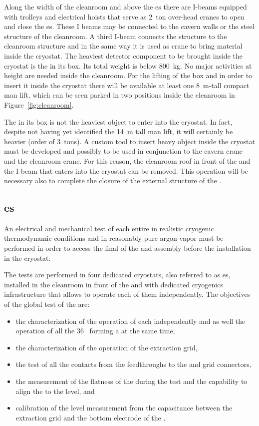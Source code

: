 Along the width of the cleanroom and above the \coldbox{}es there are I-beams equipped with trolleys and electrical hoists that serve as 2~ton over-head cranes to open and close the  \coldbox{}es.
These I beams may be connected to the cavern walls or the steel structure of the cleanroom.
A third I-beam connects the  structure to the cleanroom structure and in the same way it is used as crane to bring material inside the cryostat.
The heaviest detector component to be brought inside the cryostat is the  in its box.
Its total weight is below 800~kg.
No major activities at height are needed inside the cleanroom.
For the lifting of the  box and in order to insert it inside the cryostat there will be available at least one 8~m-tall compact man lift, which can be seen parked in two positions inside the cleanroom in Figure~\ref{fig:cleanroom}.

The  in its box is not the heaviest object to enter into the cryostat.
In fact, despite not having yet identified the 14~m tall man lift, it will certainly be heavier (order of 3~tons).
A custom tool to insert heavy object inside the cryostat must be developed and possibly to be used in conjunction to the cavern crane and the cleanroom crane.
For this reason, the cleanroom roof in front of the  and the I-beam that enters into the cryostat can be removed.
This operation will be necessary also to complete the closure of the external structure of the .

\subsection{ \Coldbox{}es}
An electrical and mechanical test of each entire  in realistic cryogenic thermodynamic conditions and in reasonably pure argon vapor must be performed in order to access the final  of the  and  assembly before the installation in the cryostat.

The tests are performed in four dedicated cryostats, also referred to as \coldbox{}es, installed in the cleanroom in front of the  and with dedicated cryogenics infrastructure that allows to operate each of them independently.
The objectives of the global test of the  are:
\begin{itemize}
\item the characterization of the  operation of each  independently and as well the  operation of all the 36~ forming a  at the same time,
\item the characterization of the  operation of the extraction grid,
\item the test of all the  contacts from the feedthroughs to the  and grid connectors,
\item the measurement of the flatness of the  during the test and the capability to align the  to the  level, and 
\item calibration of the level measurement from the capacitance between the extraction grid and the bottom electrode of the .
\end{itemize}

